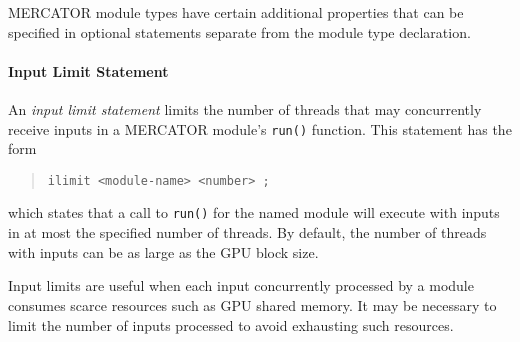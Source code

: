 \documentclass[11pt]{article}
\begin{document}
MERCATOR module types have certain additional properties that can be
specified in optional statements separate from the module type
declaration.

\paragraph*{Input Limit Statement}
An \emph{input limit statement} limits the number of threads that
may concurrently receive inputs in a MERCATOR module's \texttt{run()}
function.  This statement has the form
\begin{quote}
\texttt{ilimit <module-name> <number> ;}
\end{quote}
which states that a call to \texttt{run()} for the named module will
execute with inputs in at most the specified number of threads.  By
default, the number of threads with inputs can be as large as the
GPU block size.

Input limits are useful when each input concurrently processed by
a module consumes scarce resources such as GPU shared memory.  It
may be necessary to limit the number of inputs processed to avoid
exhausting such resources.

\begin{comment}

\paragraph*{Mapping Statement}
A \emph{mapping statement} changes the mapping of input items to
threads for a particular module's \texttt{run()} function.  It is
possible to specify that multiple GPU threads should cooperatively
process an input item, or that multiple input items should be
processed sequentially by each thread.

The mapping statement has the form
\begin{quote}
\texttt{mapping <module-name> <nelts> :~<nthreads> ;}
\end{quote}

The parameter \textit{nelts} specifies the maximum number of input items
delivered to each group of GPU threads, while \textit{nthreads} specifies the
size of a group.  For example, a mapping specification
``\texttt{2:4}'' would deliver up to two inputs to each group of four
consecutive GPU threads.  All threads in each group receive the same
two inputs; the first thread in the group is responsible for pushing
any outputs from the group to downstream channels.

\emph{At this time, specifying more than one input item per thread is not
supported.}  A future version of MERCATOR may lift this restriction.
However, thread group sizes $> 1$ are permitted.  If the number of threads
in a block is not a multiple of the group size, the residual threads that
are not part of a full group will not receive inputs.

By default, each active thread in a call to \texttt{run()} receives
one input; that is, the default mapping is ``\texttt{1:1}''.

\end{comment}
\end{document}
